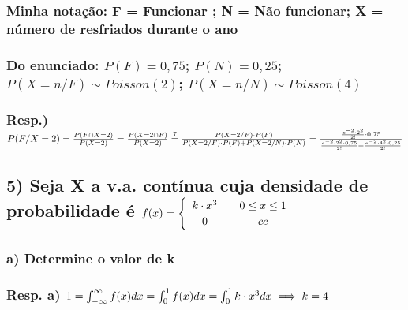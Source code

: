\documentclass[english]{article}
\begin{document}
\subsubsection*{\textmd{Minha notação: F = Funcionar ; N = Não funcionar; X = número
de resfriados durante o ano}}


\subsubsection*{\textmd{Do enunciado: $P(F)=0,75$; $P(N)=0,25$; $P(X=n/F)\sim Poisson(2)$;
$P(X=n/N)\sim Poisson(4)$}}


\subsubsection*{\textmd{Resp.) $P(F/X=2)=\frac{P(F\cap X=2)}{P(X=2)}=\frac{P(X=2\cap F)}{P(X=2)}\protect\overset{7}{=}\frac{P(X=2/F)\cdot P(F)}{P(X=2/F)\cdot P(F)+P(X=2/N)\cdot P(N)}=\frac{\frac{e^{-2}\cdot2^{2}}{2!}\cdot0,75}{\frac{e^{-2}\cdot2^{2}\cdot0,75}{2!}+\frac{e^{-2}\cdot4^{2}\cdot0,25}{2!}}$}}

\textbf{\textcompwordmark{}}


\subsection*{\textmd{5) Seja X a v.a. contínua cuja densidade de probabilidade
é $f(x)=\protect\begin{cases}
\protect\begin{array}{c}
k\cdot x^{3}\protect\\
0
\protect\end{array} & \protect\begin{array}{c}
0\leq x\leq1\protect\\
cc
\protect\end{array}\protect\end{cases}$}}


\subsubsection*{\textmd{a) Determine o valor de k}}


\subsubsection*{\textmd{Resp. a) $1=\int_{-\infty}^{\infty}f(x)dx=\int_{0}^{1}f(x)dx=\int_{0}^{1}k\cdot x^{3}dx\protect\implies k=4$}}
\end{document}
